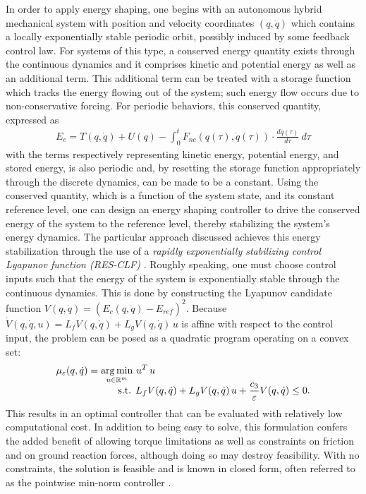 \documentclass[english]{article}
\DeclareMathOperator*{\argmin}{arg\,min}
\begin{document}
%
%
In order to apply energy shaping, one begins with an autonomous hybrid
mechanical system with position and velocity coordinates $(q, {\dot q})$ which
contains a locally exponentially stable periodic orbit, possibly induced by some
feedback control law.
%
For systems of this type, a conserved energy quantity exists through the
continuous dynamics and it comprises kinetic and potential energy as well as an
additional term.
%
This additional term can be treated with a storage function which tracks the
energy flowing out of the system; such energy flow occurs due to
non-conservative forcing.
%
For periodic behaviors, this conserved quantity, expressed as
\begin{align*}
  E_{c} = T(q, {\dot q}) + U(q) - \int_{0}^{t} \! F_{\mathit{nc}}(q(\tau), {\dot
    q}(\tau)) \cdot \frac{dq(\tau)}{d\tau} \ d\tau
\end{align*}
with the terms respectively representing kinetic energy, potential energy, and
stored energy, is also periodic and, by resetting the storage function
appropriately through the discrete dynamics, can be made to be a constant.
%
Using the conserved quantity, which is a function of the system state, and its
constant reference level, one can design an energy shaping controller to drive
the conserved energy of the system to the reference level, thereby stabilizing
the system's energy dynamics.
%
The particular approach discussed achieves this energy stabilization through the
use of a {\em rapidly exponentially stabilizing control Lyapunov function (RES-CLF)} \cite{Ames2014,Freeman1996}.
%
Roughly speaking, one must choose control inputs such that the energy of the
system is exponentially stable through the continuous dynamics.
%
This is done by constructing the Lyapunov candidate function $V(q, {\dot q}) =
(E_{c}(q, {\dot q}) - E_{\mathit{ref}})^{2}$.
%
Because ${\dot V}(q, {\dot q}, u) = L_{f} V(q, {\dot q}) + L_{g} V(q, {\dot
  q}) \, u$ is affine with respect to the control input, the problem can be
posed as a quadratic program operating on a convex set:
\begin{align*}
  \mu_{\varepsilon}(q, {\dot q}) = \argmin_{u \in \mathbb{R}^{m}} & \ u^T \, u\\[-.5em]
  &\hspace{-1.5em}\mbox{s.t. } L_{f} V (q, {\dot q}) + L_{g} V(q, {\dot q}) \, u
  + \frac{c_{3}}{\varepsilon} V(q, {\dot q}) \leq 0.
\end{align*}
This results in an optimal controller that can be evaluated with relatively low
computational cost.
%
In addition to being easy to solve, this formulation confers the added benefit
of allowing torque limitations as well as constraints on friction and on ground
reaction forces, although doing so may destroy feasibility.
%
With no constraints, the solution is feasible and is known in closed form, often
referred to as the pointwise min-norm controller \cite{Freeman1996}.
\end{document}

